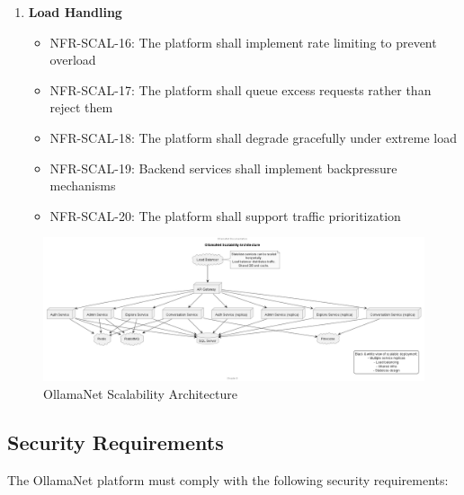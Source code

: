 \begin{enumerate}
   \item \textbf{Load Handling}
   \begin{itemize}
      \item NFR-SCAL-16: The platform shall implement rate limiting to prevent overload
      \item NFR-SCAL-17: The platform shall queue excess requests rather than reject them
      \item NFR-SCAL-18: The platform shall degrade gracefully under extreme load
      \item NFR-SCAL-19: Backend services shall implement backpressure mechanisms
      \item NFR-SCAL-20: The platform shall support traffic prioritization
   \end{itemize}
\end{enumerate}

\begin{figure}[p]
    \centering
    \includegraphics[width=\textwidth]{./Chapter03/figures/Scalability_Architecture.png}
    \caption{OllamaNet Scalability Architecture}
    \label{fig:scalability-architecture}
\end{figure}
\clearpage

\subsection{Security Requirements}

The OllamaNet platform must comply with the following security requirements:

